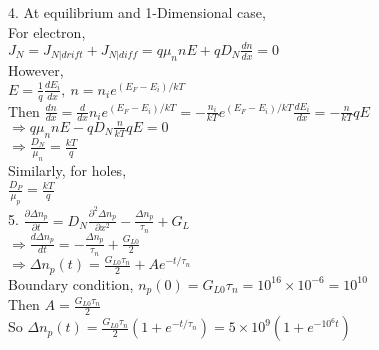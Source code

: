 \documentclass[11pt,oneside,a4paper]{article}
\begin{document}
4.\: At equilibrium and 1-Dimensional case, \\

\quad\:  For electron, \\

\hspace{8.5mm} \(J_N=J_{N|drift}+J_{N|diff}=q\mu_nnE+qD_N\frac{dn}{dx}=0\) \\

\quad\: However, \\

\hspace{8.5mm} \(E=\frac{1}{q}\frac{dE_i}{dx},\ n=n_ie^{(E_F-E_i)/kT}\) \\

\quad\: Then \(\frac{dn}{dx}=\frac{d}{dx}n_ie^{(E_F-E_i)/kT}=-\frac{n_i}{kT}e^{(E_F-E_i)/kT}\frac{dE_i}{dx}=-\frac{n}{kT}qE\) \\

\hspace{8.5mm} \(\Rightarrow q\mu_nnE-qD_N\frac{n}{kT}qE=0\) \\

\hspace{8.5mm} \(\Rightarrow\frac{D_N}{\mu_n}=\frac{kT}{q}\) \\

\quad\: Similarly, for holes, \\

\hspace{8.5mm} \(\frac{D_P}{\mu_p}=\frac{kT}{q}\) \\

5.\: \(\frac{\partial\Delta n_p}{\partial t}=D_N\frac{\partial^2\Delta n_p}{\partial x^2}-\frac{\Delta n_p}{\tau_n}+G_L\) \\

\quad\: \(\Rightarrow\frac{d\Delta n_p}{dt}=-\frac{\Delta n_p}{\tau_n}+\frac{G_{L0}}{2}\) \\

\quad\: \(\Rightarrow\Delta n_p(t)=\frac{G_{L0}\tau_n}{2}+Ae^{-t/\tau_n}\) \\

\quad\: Boundary condition, \(n_p(0)=G_{L0}\tau_n=10^{16}\times10^{-6}=10^{10}\) \\

\quad\: Then \(A=\frac{G_{L0}\tau_n}{2}\) \\

\quad\: So \(\Delta n_p(t)=\frac{G_{L0}\tau_n}{2}(1+e^{-t/\tau_n})=5\times10^9(1+e^{-10^6t})\) \\
\end{document}
